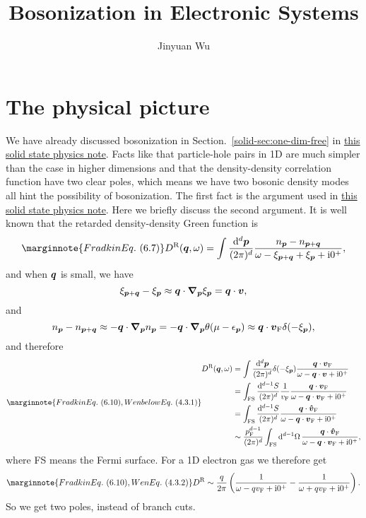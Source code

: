 \documentclass[hyperref, a4paper]{article}
\title{Bosonization in Electronic Systems}
\author{Jinyuan Wu}
\newcommand*{\ii}{\mathrm{i}}
\newcommand{\soliddoc}{\href{../solid/solid.pdf}{this solid state physics note}}
\begin{document}
    
\maketitle

\section{The physical picture}

We have already discussed bosonization in Section.~\ref{solid-sec:one-dim-free} in \soliddoc.
Facts like that particle-hole pairs in 1D are much simpler than the case in higher dimensions and that the density-density correlation function have two clear poles, which means we have two bosonic density modes 
all hint the possibility of bosonization.
The first fact is the argument used in \soliddoc. Here we briefly discuss the second argument.
It is well known that the retarded density-density Green function is 
\begin{equation} \marginnote{Fradkin Eq.~(6.7)}
    D^\text{R}(\vb*{q}, \omega) = \int \frac{\dd[d]{\vb*{p}}}{(2\pi)^d} \frac{n_{\vb*{p}} - n_{\vb*{p} + \vb*{q}}}{\omega - \xi_{\vb*{p} + \vb*{q}} + \xi_{\vb*{p}} + \ii 0^+},
\end{equation}
and when $\vb*{q}$ is small, we have 
\[
    \xi_{\vb*{p} + \vb*{q}} - \xi_{\vb*{p}} \approx \vb*{q} \cdot \grad_{\vb*{p}} \xi_{\vb*{p}} = \vb*{q} \cdot \vb*{v},
\]
and 
\[
    n_{\vb*{p}} - n_{\vb*{p} + \vb*{q}} \approx - \vb*{q} \cdot \grad_{\vb*{p}}{n_{\vb*{p}}} = 
    - \vb*{q} \cdot \grad_{\vb*{p}} \theta(\mu - \epsilon_{\vb*{p}}) \approx \vb*{q} \cdot \vb*{v}_\text{F} \delta(- \xi_{\vb*{p}}),
\]
and therefore 
\begin{equation} \marginnote{Fradkin Eq.~(6.10), Wen below Eq.~(4.3.1)}
    \begin{aligned}
        D^\text{R}(\vb*{q}, \omega) &= \int \frac{\dd[d]{\vb*{p}}}{(2\pi)^d} \delta(-\xi_{\vb*{p}}) \frac{\vb*{q} \cdot \vb*{v}_\text{F}}{\omega - \vb*{q} \cdot \vb*{v} + \ii 0^+} \\
        &= \int_\text{FS} \frac{\dd[d-1]{S}}{(2\pi)^d} \frac{1}{v_\text{F}} \frac{\vb*{q} \cdot \vb*{v}_\text{F}}{\omega - \vb*{q} \cdot \vb*{v}_\text{F} + \ii 0^+}  \\
        &= \int_\text{FS} \frac{\dd[d-1]{S}}{(2\pi)^d} \frac{\vb*{q} \cdot \vu*{v}_\text{F}}{\omega - \vb*{q} \cdot \vb*{v}_\text{F} + \ii 0^+} \\
        &\sim \frac{p_\text{F}^{d-1}}{(2\pi)^d} \int_\text{FS} \dd[d-1]{\Omega} \frac{\vb*{q} \cdot \vu*{v}_\text{F}}{\omega - \vb*{q} \cdot \vb*{v}_\text{F} + \ii 0^+} ,
    \end{aligned}
\end{equation}
where FS means the Fermi surface. For a 1D electron gas we therefore get 
\begin{equation} \marginnote{Fradkin Eq.~(6.10), Wen Eq.~(4.3.2)}
    D^\text{R} \sim \frac{q}{2\pi} \left( \frac{1}{\omega - q v_\text{F} + \ii 0^+} - \frac{1}{\omega + q v_\text{F} + \ii 0^+} \right). 
\end{equation}
So we get two poles, instead of branch cuts. 
\end{document}
